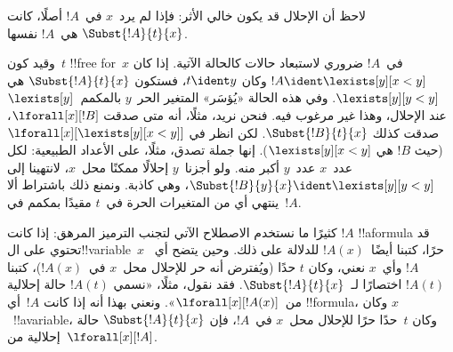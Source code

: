 \documentclass[../../../include/open-logic-section]{subfiles}
\begin{document}
\begin{explain}
لاحظ أن الإحلال قد يكون خالي الأثر: فإذا لم يرد~$x$ في~$!A$ أصلًا،
كانت $\Subst{!A}{t}{x}$ هي~$!A$ نفسها.

وقيد كون~$t$ !!{free for}~$x$ في~$!A$ ضروري لاستبعاد حالات كالحالة
الآتية. إذا كان $!A \ident \lexists[y][x < y]$ وكان $t \ident y$،
فستكون $\Subst{!A}{t}{x}$ هي $\lexists[y][y < y]$. وفي هذه الحالة
«يُؤسَر» المتغير الحر~$y$ بالمكمم~$\lexists[y]$ عند الإحلال، وهذا غير
مرغوب فيه. فنحن نريد، مثلًا، أنه متى صدقت $\lforall[x][!B]$، صدقت
كذلك $\Subst{!B}{t}{x}$. لكن انظر في
$\lforall[x][\lexists[y][x < y]]$ (حيث $!B$ هي $\lexists[y][x <
  y]$). إنها جملة تصدق، مثلًا، على الأعداد الطبيعية: لكل عدد~$x$
عدد~$y$ أكبر منه. ولو أجزنا~$y$ إحلالًا ممكنًا محل~$x$، لانتهينا إلى
$\Subst{!B}{y}{x} \ident \lexists[y][y < y]$، وهي كاذبة. ونمنع
ذلك باشتراط ألا ينتهي أي من المتغيرات الحرة في~$t$ مقيدًا بمكمم
في~$!A$.
\end{explain}

كثيرًا ما نستخدم الاصطلاح الآتي لتجنب الترميز المرهق: إذا كانت
$!A$ !!a{formula} قد تحتوي على ال!!{variable}~$x$ حرًا، كتبنا
أيضًا~$!A(x)$ للدلالة على ذلك. وحين يتضح أي~$!A$ وأي~$x$ نعني، وكان
$t$ حدًا (ويُفترض أنه حر للإحلال محل~$x$ في~$!A(x)$)، كتبنا
$!A(t)$ اختصارًا لـ~$\Subst{!A}{t}{x}$. فقد نقول، مثلًا، «نسمي
$!A(t)$ حالة إحلالية من~$\lforall[x][!A(x)]$». ونعني بهذا أنه إذا
كانت $!A$~أي !!{formula}، وكان $x$~!!a{variable}، وكان $t$~حدًا
حرًا للإحلال محل~$x$ في~$!A$، فإن $\Subst{!A}{t}{x}$ حالة إحلالية
من~$\lforall[x][!A]$.
\end{document}
